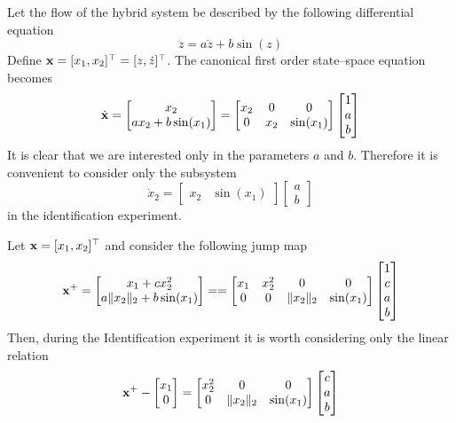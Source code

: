 \begin{exmp}\label{ex:ex2}
	Let the flow of the hybrid system be described by the following differential equation
	\begin{equation}
	    \ddot{z}=a\dot{z}+b\sin(z)
	\end{equation}
	Define $\mathbf{x} = [x_1,x_2]^\top=[z,\dot{z}]^\top$. The canonical first order state--space equation becomes
	\[\dot{\mathbf{x}}=\begin{bmatrix}x_2\\ax_2+b\sin(x_1)\end{bmatrix}=\begin{bmatrix}x_2&0&0\\0&x_2&\sin(x_1)\end{bmatrix}\begin{bmatrix}1\\a\\b\end{bmatrix}\]
	It is clear that we are interested only in the parameters $a$ and $b$. Therefore it is convenient to consider only the subsystem
	\[\dot{x}_2=\begin{bmatrix}x_2&\sin(x_1)\end{bmatrix}\begin{bmatrix}a\\b\end{bmatrix}\] 
	in the identification experiment.
\end{exmp}
\begin{exmp}\label{ex:ex3}
	Let $\mathbf{x}=[x_1,x_2]^\top$ and consider the following jump map
	\begin{align}
	    {\mathbf{x}}^+=\begin{bmatrix}x_1+cx_2^2\\a\|x_2\|_2+b\sin(x_1)\end{bmatrix}=
	    =\begin{bmatrix}x_1&x_2^2&0&0\\0&0&\|x_2\|_2&\sin(x_1)\end{bmatrix}\begin{bmatrix}1\\c\\a\\b\end{bmatrix}
	\end{align}
	Then, during the Identification experiment it is worth considering only the linear relation
	\begin{equation}
	    {\mathbf{x}}^+-\begin{bmatrix}x_1\\0\end{bmatrix}=\begin{bmatrix}x_2^2&0&0\\0&\|x_2\|_2&\sin(x_1)\end{bmatrix}\begin{bmatrix}c\\a\\b\end{bmatrix}
	\end{equation}
\end{exmp}
%
